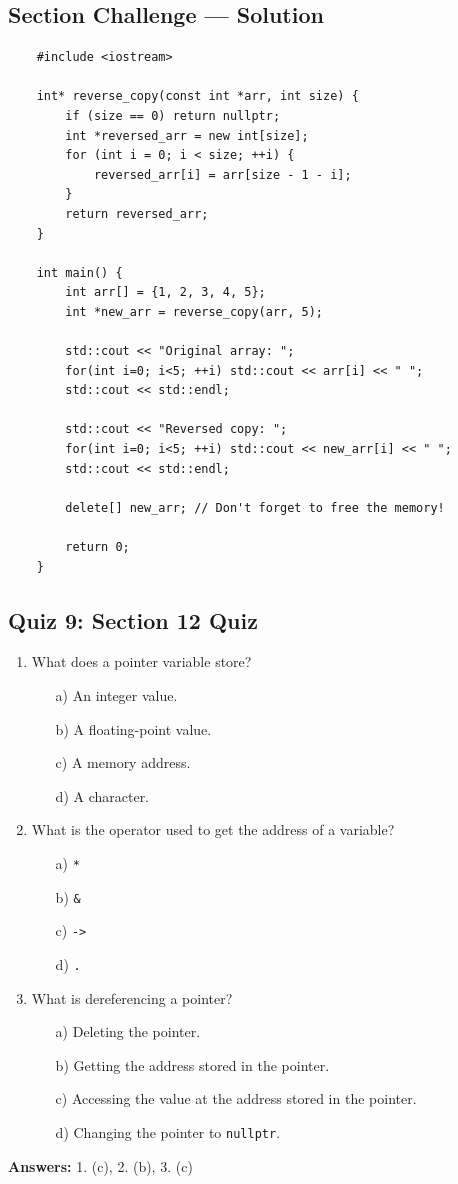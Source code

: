 \subsection{Section Challenge --- Solution}
\begin{lstlisting}
	#include <iostream>

	int* reverse_copy(const int *arr, int size) {
		if (size == 0) return nullptr;
		int *reversed_arr = new int[size];
		for (int i = 0; i < size; ++i) {
			reversed_arr[i] = arr[size - 1 - i];
		}
		return reversed_arr;
	}

	int main() {
		int arr[] = {1, 2, 3, 4, 5};
		int *new_arr = reverse_copy(arr, 5);

		std::cout << "Original array: ";
		for(int i=0; i<5; ++i) std::cout << arr[i] << " ";
		std::cout << std::endl;

		std::cout << "Reversed copy: ";
		for(int i=0; i<5; ++i) std::cout << new_arr[i] << " ";
		std::cout << std::endl;

		delete[] new_arr; // Don't forget to free the memory!

		return 0;
	}
\end{lstlisting}

\subsection{Quiz 9: Section 12 Quiz}
\begin{enumerate}
	\item What does a pointer variable store?
	\begin{enumerate}
		\item[a)] An integer value.
		\item[b)] A floating-point value.
		\item[c)] A memory address.
		\item[d)] A character.
	\end{enumerate}

	\item What is the operator used to get the address of a variable?
	\begin{enumerate}
		\item[a)] \texttt{*}
		\item[b)] \texttt{\&}
		\item[c)] \texttt{->}
		\item[d)] \texttt{.}
	\end{enumerate}

	\item What is dereferencing a pointer?
	\begin{enumerate}
		\item[a)] Deleting the pointer.
		\item[b)] Getting the address stored in the pointer.
		\item[c)] Accessing the value at the address stored in the pointer.
		\item[d)] Changing the pointer to \texttt{nullptr}.
	\end{enumerate}
\end{enumerate}

\textbf{Answers:} 1. (c), 2. (b), 3. (c)
